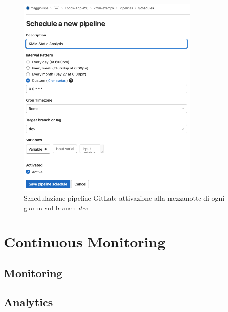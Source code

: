 \begin{figure}[H]
\centering
\includegraphics[width=0.8\textwidth]{img/Screenshot 2022-07-02 at 19.34.42.png}
\caption{Schedulazione pipeline GitLab: attivazione alla mezzanotte di ogni giorno sul branch \textit{dev}}
\end{figure}

\section{Continuous Monitoring}
\subsection{Monitoring}
\subsection{Analytics}

